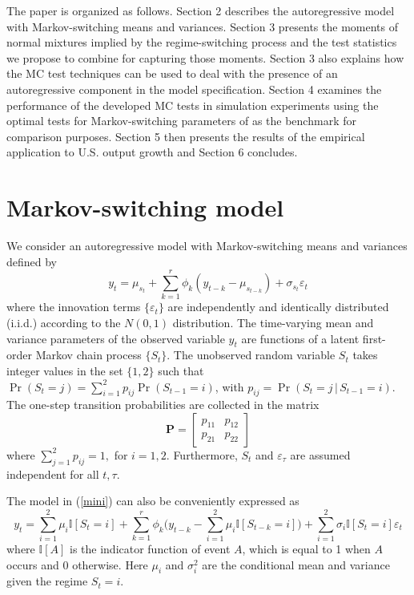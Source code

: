 \documentclass[11pt]{article}
\begin{document}
The paper is organized as follows. Section 2 describes the autoregressive
model with Markov-switching means and variances. Section 3 presents the
moments of normal mixtures implied by the regime-switching process and the
test statistics we propose to combine for capturing those moments. Section 3
also explains how the MC test techniques can be used to deal with the
presence of an autoregressive component in the model specification. Section
4 examines the performance of the developed MC tests in simulation
experiments using the optimal tests for Markov-switching parameters of %
\citet{Carrasco-Hu-Ploberger:2014} as the benchmark for comparison purposes.
Section 5 then presents the results of the empirical application to U.S.
output growth and Section 6 concludes.

\section{Markov-switching model}

We consider an autoregressive model with Markov-switching means and
variances defined by 
\begin{equation}
y_{t}=\mu _{s_{t}}+\sum_{k=1}^{r}\phi _{k}(y_{t-k}-\mu _{s_{t-k}})+\sigma
_{s_{t}}\varepsilon _{t}  \label{mini}
\end{equation}%
where the innovation terms $\{\varepsilon _{t}\}$ are independently and
identically distributed (i.i.d.) according to the $N(0,1)$ distribution. The
time-varying mean and variance parameters of the observed variable $y_{t}$
are functions of a latent first-order Markov chain process $\{S_{t}\}.$ The
unobserved random variable $S_{t}$ takes integer values in the set $\{1,2\}$
such that \sloppy$\Pr (S_{t}=j)=\sum_{i=1}^{2}p_{ij}\Pr (S_{t-1}=i)$, with $%
p_{ij}=\Pr (S_{t}=j\,|\,S_{t-1}=i)$. The one-step transition probabilities
are collected in the matrix 
\begin{equation*}
\mathbf{P}=\left[ 
\begin{array}{cc}
p_{11} & p_{12} \\ 
p_{21} & p_{22}%
\end{array}%
\right] 
\end{equation*}%
where $\sum_{j=1}^{2}p_{ij}=1$\thinspace $,$ for $i=1,2$. Furthermore, $S_{t}
$ and $\varepsilon _{\tau }$ are assumed independent for all $t,\tau $.

The model in (\ref{mini}) can also be conveniently expressed as 
\begin{equation}
y_{t}=\sum_{i=1}^{2}\mu _{i}\mathbb{I}[S_{t}=i]+\sum_{k=1}^{r}\phi _{k}\big(%
y_{t-k}-\sum_{i=1}^{2}\mu _{i}\mathbb{\mathbb{I}}[S_{t-k}=i]\big)%
+\sum_{i=1}^{2}\sigma _{i}\mathbb{\mathbb{I}}[S_{t}=i]\varepsilon _{t}
\label{m1}
\end{equation}%
where $\mathbb{I}[A]$ is the indicator function of event $A$, which is equal
to 1 when $A$ occurs and 0 otherwise. Here $\mu _{i}$ and $\sigma _{i}^{2}$
are the conditional mean and variance given the regime $S_{t}=i.$
\end{document}
